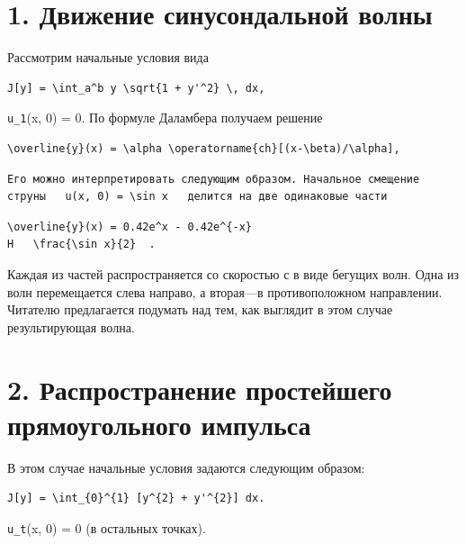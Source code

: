 \documentclass[
  ukrainian,
]{article}
\begin{document}
\section{1. Движение синусондальной
волны}\label{ux434ux432ux438ux436ux435ux43dux438ux435-ux441ux438ux43dux443ux441ux43eux43dux434ux430ux43bux44cux43dux43eux439-ux432ux43eux43bux43dux44b}

Рассмотрим начальные условия вида

\begin{verbatim}
J[y] = \int_a^b y \sqrt{1 + y'^2} \, dx,
\end{verbatim}

\texttt{u\_1}(x, 0) = 0. По формуле Даламбера получаем решение

\begin{verbatim}
\overline{y}(x) = \alpha \operatorname{ch}[(x-\beta)/\alpha],
\end{verbatim}

\begin{verbatim}
Его можно интерпретировать следующим образом. Начальное смещение струны   u(x, 0) = \sin x   делится на две одинаковые части
\end{verbatim}

\begin{verbatim}
\overline{y}(x) = 0.42e^x - 0.42e^{-x}
H   \frac{\sin x}{2}  .
\end{verbatim}

Каждая из частей распространяется со скоростью с в виде бегущих волн.
Одна из волн перемещается слева направо, а вторая---в противоположном
направлении. Читателю предлагается подумать над тем, как выглядит в этом
случае результирующая волна.

\section{2. Распространение простейшего прямоугольного
импульса}\label{ux440ux430ux441ux43fux440ux43eux441ux442ux440ux430ux43dux435ux43dux438ux435-ux43fux440ux43eux441ux442ux435ux439ux448ux435ux433ux43e-ux43fux440ux44fux43cux43eux443ux433ux43eux43bux44cux43dux43eux433ux43e-ux438ux43cux43fux443ux43bux44cux441ux430}

В этом случае начальные условия задаются следующим образом:

\begin{verbatim}
J[y] = \int_{0}^{1} [y^{2} + y'^{2}] dx.
\end{verbatim}

\texttt{u\_t}(x, 0) = 0 (в остальных точках).
\end{document}
